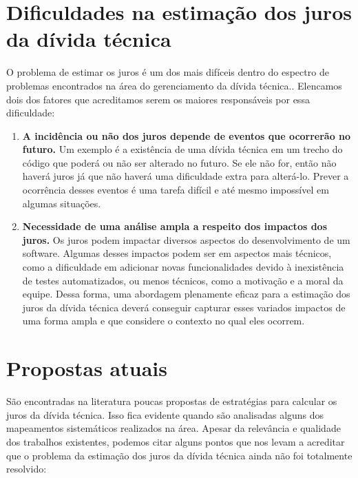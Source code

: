 \section{Dificuldades na estimação dos juros da dívida técnica}


O problema de estimar os juros é um dos mais difíceis dentro do espectro de problemas encontrados na área do gerenciamento da dívida técnica.\cite{zazworka2011investigating,power2013understanding,yli2016software,schmid2013formal}. Elencamos dois dos fatores que acreditamos serem os maiores responsáveis por essa dificuldade:

\begin{enumerate}


\item \textbf{A incidência ou não dos juros depende de eventos que ocorrerão no futuro.} Um exemplo é a existência de uma dívida técnica em um trecho do código que poderá ou não ser alterado no futuro. Se ele não for, então não haverá juros já que não haverá uma dificuldade extra para alterá-lo. Prever a ocorrência desses eventos é uma tarefa difícil e até mesmo impossível em algumas situações.

\item \textbf{Necessidade de uma análise ampla a respeito dos impactos dos juros.} Os juros podem impactar diversos aspectos do desenvolvimento de um software. Algumas desses impactos podem ser em aspectos mais técnicos, como a dificuldade em adicionar novas funcionalidades devido à inexistência de testes automatizados, ou menos técnicos, como a motivação  e a moral da equipe\cite{spinola2013investigating}.
Dessa forma, uma abordagem plenamente eficaz  para a estimação dos juros da dívida técnica deverá conseguir capturar esses variados impactos de uma forma ampla e que considere o contexto no qual eles ocorrem.




\end{enumerate}


\section{Propostas atuais}
\label{modelos_existentes}

São encontradas na literatura poucas propostas de estratégias para calcular os juros da dívida técnica.  Isso fica evidente quando são analisadas alguns dos mapeamentos sistemáticos realizados na área\cite{ampatzoglou2015financial,li2015systematic,behutiye2017analyzing}. Apesar da relevância e qualidade dos trabalhos existentes, podemos citar alguns pontos que nos levam a acreditar que o problema da estimação dos juros da dívida técnica ainda não foi totalmente resolvido:


